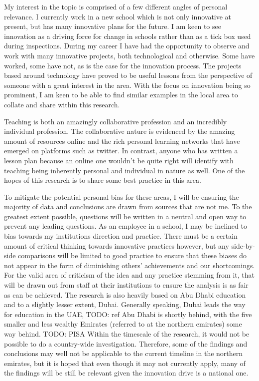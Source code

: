 My interest in the topic is comprised of a few different angles of personal relevance. I currently work in a new school which is not only innovative at present, but has many innovative plans for the future. I am keen to see innovation as a driving force for change in schools rather than as a tick box used during inspections. During my career I have had the opportunity to observe and work with many innovative projects, both technological and otherwise. Some have worked, some have not, as is the case for the innovation process. The projects based around technology have proved to be useful lessons from the perspective of someone with a great interest in the area. With the focus on innovation being so prominent, I am keen to be able to find similar examples in the local area to collate and share within this research.

Teaching is both an amazingly collaborative profession and an incredibly individual profession. The collaborative nature is evidenced by the amazing amount of resources online and the rich personal learning networks that have emerged on platforms such as twitter. In contrast, anyone who has written a lesson plan because an online one wouldn't be quite right will identify with teaching being inherently personal and individual  in nature as well. One of the hopes of this research is to share some best practice in this area.

To mitigate the potential personal bias for these areas, I will be ensuring the majority of data and conclusions are drawn from sources that are not me. To the greatest extent possible, questions will be written in a neutral and open way to prevent any leading questions.
As an employee in a school, I may be inclined to bias towards my institutions direction and practice. There must be a certain amount of critical thinking towards innovative practices however, but any side-by-side comparisons will be limited to good practice to ensure that these biases do not appear in the form of diminishing others’ achievements and our shortcomings. For the valid area of criticism of the idea and any practice stemming from it, that will be drawn out from staff at their institutions to ensure the analysis is as fair as can be achieved.
The research is also heavily based on Abu Dhabi education and to a slightly lesser extent, Dubai. Generally speaking, Dubai leads the way for education in the UAE, TODO: ref Abu Dhabi is shortly behind, with the five smaller and less wealthy Emirates (referred to at the northern emirates) some way behind. TODO: PISA Within the timescale of the research, it would not be possible to do a country-wide investigation. Therefore, some of the findings and conclusions may well not be applicable to the current timeline in the northern emirates, but it is hoped that even though it may not currently apply, many of the findings will be still be relevant given the innovation drive is a national one.

\theendnotes

